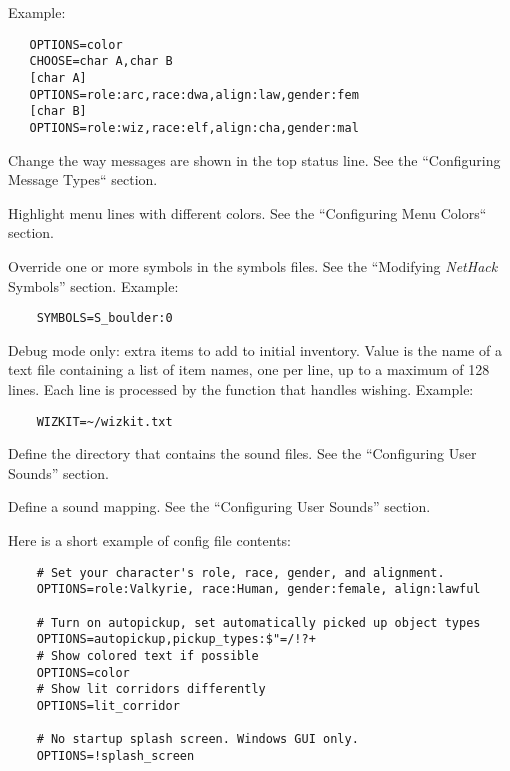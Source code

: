 Example:
\begin{verbatim}
   OPTIONS=color
   CHOOSE=char A,char B
   [char A]
   OPTIONS=role:arc,race:dwa,align:law,gender:fem
   [char B]
   OPTIONS=role:wiz,race:elf,align:cha,gender:mal
\end{verbatim}

\item[\bb{MSGTYPE}]
Change the way messages are shown in the top status line.
See the ``Configuring Message Types`` section.
\item[\bb{MENUCOLOR}]
Highlight menu lines with different colors.
See the ``Configuring Menu Colors`` section.
\item[\bb{SYMBOLS},\bb{ROGUESYMBOLS}]
Override one or more symbols in the symbols files.
See the ``Modifying {\it NetHack\/} Symbols'' section.
Example:
\begin{verbatim}
    SYMBOLS=S_boulder:0
\end{verbatim}

\item[\bb{WIZKIT}]
Debug mode only:  extra items to add to initial inventory.
Value is the name of a text file containing a list of item names,
one per line, up to a maximum of 128 lines.
Each line is processed by the function that handles wishing.
Example:
\begin{verbatim}
    WIZKIT=~/wizkit.txt
\end{verbatim}
\item[\bb{SOUNDDIR}]
Define the directory that contains the sound files.
See the ``Configuring User Sounds'' section.
\item[\bb{SOUND}]
Define a sound mapping. See the ``Configuring User Sounds'' section.
\elist

Here is a short example of config file contents:
\begin{verbatim}
    # Set your character's role, race, gender, and alignment.
    OPTIONS=role:Valkyrie, race:Human, gender:female, align:lawful

    # Turn on autopickup, set automatically picked up object types
    OPTIONS=autopickup,pickup_types:$"=/!?+
    # Show colored text if possible
    OPTIONS=color
    # Show lit corridors differently
    OPTIONS=lit_corridor

    # No startup splash screen. Windows GUI only.
    OPTIONS=!splash_screen
\end{verbatim}


